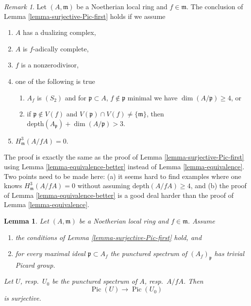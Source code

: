 \documentclass{stacks-project}
\theoremstyle{plain}
\newtheorem{lemma}[subsection]{Lemma}
\theoremstyle{definition}
\theoremstyle{remark}
\newtheorem{remark}[subsection]{Remark}
\numberwithin{equation}{subsection}
\def\Pic{\mathop{\mathrm{Pic}}\nolimits}
\begin{document}
\begin{remark}
\label{remark-surjective-Pic-second}
Let $(A, \mathfrak m)$ be a Noetherian local ring and $f \in \mathfrak m$.
The conclusion of Lemma \ref{lemma-surjective-Pic-first} holds if we assume
\begin{enumerate}
\item $A$ has a dualizing complex,
\item $A$ is $f$-adically complete,
\item $f$ is a nonzerodivisor,
\item one of the following is true
\begin{enumerate}
\item $A_f$ is $(S_2)$ and for $\mathfrak p \subset A$,
$f \not \in \mathfrak p$ minimal we have $\dim(A/\mathfrak p) \geq 4$, or
\item if $\mathfrak p \not \in V(f)$ and
$V(\mathfrak p) \cap V(f) \not = \{\mathfrak m\}$, then
$\text{depth}(A_\mathfrak p) + \dim(A/\mathfrak p) > 3$.
\end{enumerate}
\item $H^3_{\mathfrak m}(A/fA) = 0$.
\end{enumerate}
The proof is exactly the same as the proof of
Lemma \ref{lemma-surjective-Pic-first}
using Lemma \ref{lemma-equivalence-better} instead of
Lemma \ref{lemma-equivalence}.
Two points need to be made here: (a)
it seems hard to find examples where one knows
$H^3_{\mathfrak m}(A/fA) = 0$ without assuming
$\text{depth}(A/fA) \geq 4$, and
(b) the proof of Lemma \ref{lemma-equivalence-better} is a
good deal harder than the proof of Lemma \ref{lemma-equivalence}.
\end{remark}

\begin{lemma}
\label{lemma-surjective-Pic-first-better}
Let $(A, \mathfrak m)$ be a Noetherian local ring and $f \in \mathfrak m$.
Assume
\begin{enumerate}
\item the conditions of Lemma \ref{lemma-surjective-Pic-first} hold, and
\item for every maximal ideal $\mathfrak p \subset A_f$
the punctured spectrum of $(A_f)_\mathfrak p$ has trivial Picard group.
\end{enumerate}
Let $U$, resp.\ $U_0$ be the punctured spectrum of $A$, resp.\ $A/fA$.
Then
$$
\Pic(U) \longrightarrow \Pic(U_0)
$$
is surjective.
\end{lemma}
\end{document}
